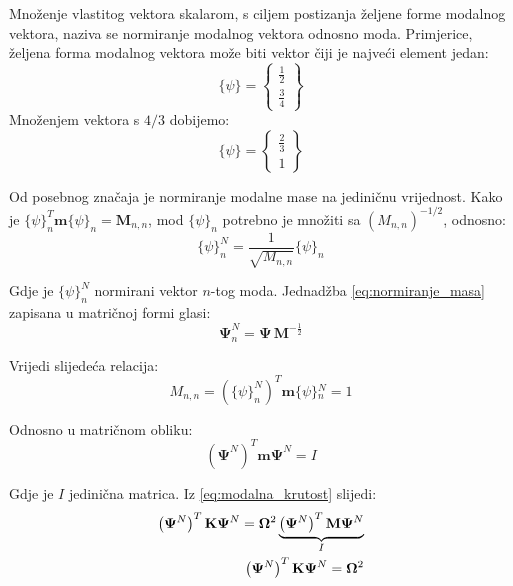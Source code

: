 \documentclass{rgn}
\newcommand\ffrac[2]{\frac{\displaystyle #1}{\displaystyle #2}}
\newcommand\mm{\mathbf{m}}
\newcommand\ppsi{\mathbf{\Psi}}
\newcommand\oomega{\mathbf{\Omega}}
\newcommand\K{\mathbf{K}}
\newcommand\M{\mathbf{M}}
\begin{document}
Množenje vlastitog vektora skalarom, s ciljem postizanja željene forme modalnog
vektora, naziva se normiranje modalnog vektora odnosno moda. Primjerice, željena forma 
modalnog vektora može biti vektor čiji je najveći element jedan:
\[
    \{\psi\}=
        \begin{Bmatrix}
            \ffrac{1}{2}\\[8pt]
            \ffrac{3}{4}
        \end{Bmatrix}
\]
Množenjem vektora s $4/3$ dobijemo:
\[
    \{\psi\}=
        \begin{Bmatrix}
            \ffrac{2}{3}\\[6pt]
            1
        \end{Bmatrix}
\]

Od posebnog značaja je normiranje modalne mase na jediničnu vrijednost. Kako je
$\{\psi\}_n^T\mm\{\psi\}_n=\mathbf{M}_{n,n}$, mod $\{\psi\}_n$
potrebno je množiti sa $(M_{n,n})^{-1/2}$, odnosno:
\begin{equation}\label{eq:normiranje_masa}
    \{\psi\}_n^N=\frac{1}{\sqrt{M_{n,n}}}\{\psi\}_n
\end{equation}

Gdje je $\{\psi\}_n^N$ normirani vektor $n$-tog moda. Jednadžba
\eqref{eq:normiranje_masa} zapisana u matričnoj formi glasi:
\begin{equation}\label{eq:normiranje_masa_matricno}
    \ppsi_n^N=\ppsi\,\mathbf{M}^{-\frac{1}{2}}
\end{equation}

Vrijedi slijedeća relacija:
\begin{equation}\label{eq:relacija_normirani}
        M_{n,n}=\left(\{\psi\}_n^N\right)^T\mm\{\psi\}{}_n^N=1
\end{equation}

Odnosno u matričnom obliku:
\begin{equation}\label{eq:relacija_normirani_matricno}
    \left(\ppsi^N\right)^T\mm\ppsi^N=I
\end{equation}

Gdje je $I$ jedinična matrica. Iz \eqref{eq:modalna_krutost} slijedi:
\begin{equation}
    \begin{split}
        \left(\ppsi^N\right)^T\K\ppsi^N=\oomega^2\underbrace{\left(\ppsi^N\right)^T\M\ppsi^N}_{\text{$I$}} \notag\\
        \left(\ppsi^N\right)^T\K\ppsi^N=\oomega^2\label{eq:normirana_krutost}
    \end{split}
\end{equation}
\end{document}
